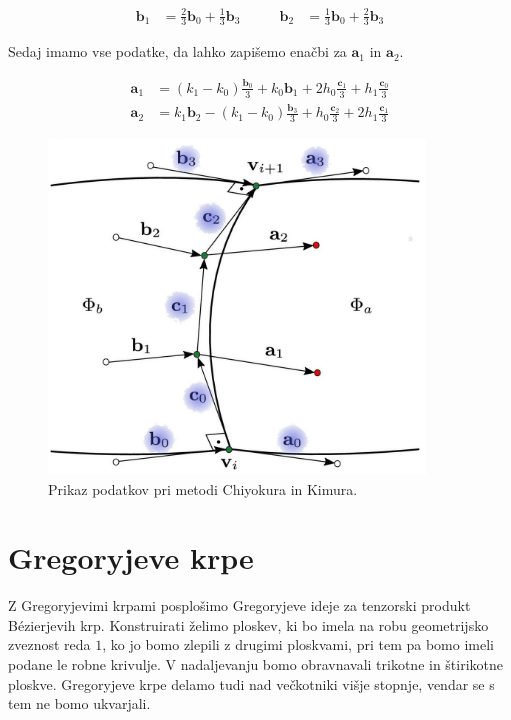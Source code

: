\documentclass[a4paper,regno]{article}
\newcommand{\tbf}{\textbf}
\begin{document}
	\begin{equation*}
		\begin{split}
			\tbf{b}_1 &= \frac{2}{3}\tbf{b}_0 + \frac{1}{3}\tbf{b}_3
		\end{split}
		\quad\quad
		\begin{split}
			\tbf{b}_2 &= \frac{1}{3}\tbf{b}_0 + \frac{2}{3}\tbf{b}_3
		\end{split}
	\end{equation*}

	Sedaj imamo vse podatke, da lahko zapišemo enačbi za $\textbf{a}_1$ in $\textbf{a}_2$.

	\begin{align*}
		\tbf{a}_1 &= (k_1 - k_0)\frac{\tbf{b}_0}{3} + k_0\tbf{b}_1 + 2h_0\frac{\tbf{c}_1}{3} + h_1\frac{\tbf{c}_0}{3} \\
		\tbf{a}_2 &= k_1\tbf{b}_2 - (k_1 - k_0)\frac{\tbf{b}_3}{3} + h_0\frac{\tbf{c}_2}{3} + 2h_1\frac{\tbf{c}_1}{3}
	\end{align*}

	\begin{figure}[h]
		\centering
		\includegraphics[width=10cm]{metoda_CinK_pobarvano.jpg}
		\caption{Prikaz podatkov pri metodi Chiyokura in Kimura.}
		\label{fig:chi_ki_metoda}
	\end{figure}


\section{Gregoryjeve krpe}
Z Gregoryjevimi krpami posplošimo Gregoryjeve ideje za tenzorski produkt Bézierjevih krp.
Konstruirati želimo ploskev, ki bo imela na robu geometrijsko zveznost reda $1$, ko jo bomo zlepili z drugimi ploskvami, pri tem pa bomo imeli podane le robne krivulje. V nadaljevanju bomo obravnavali trikotne in štirikotne ploskve. Gregoryjeve krpe delamo tudi nad večkotniki višje stopnje, vendar se s tem ne bomo ukvarjali.
\end{document}
